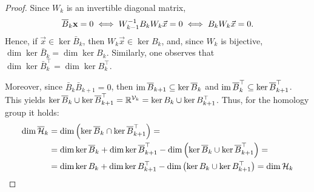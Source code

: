 \begin{proof}
Since \( W_k \) is an invertible diagonal matrix, 
\begin{equation*}
    \overline{B}_k \mathbf{x} = 0 \iff W_{k-1}^{-1}B_k W_k \vec x =0 \iff B_k W_k \vec x =0. 
\end{equation*}
Hence, if \( \vec x \in \ker \bar B_k \), then \( W_k \vec x \in \ker B_k \), and, since \( W_k \) is bijective, \( \dim \ker \bar B_k = \dim \ker B_k \). Similarly, one observes that \( \dim \ker \bar B_k^\top = \dim \ker B_k^\top \).

Moreover, since \( \bar B_k \bar B_{k+1} =0 \), then \( \operatorname{im} \overline{B}_{k+1} \subseteq \ker \overline{B}_k \) and \( \operatorname{im} \overline{B}_k^\top \subseteq \ker \overline{B}_{k+1}^\top \). This yields \( \ker \overline{B}_k \cup \ker \overline{B}_{k+1}^\top = \mathbb{R}^{\mathcal{V}_k} = \ker B_k \cup \ker  B_{k+1}^\top\). Thus, for the homology group it holds:
\begin{equation*}
      \begin{aligned}
    \dim \overline{\mathcal{H}}_k & = \dim \left( \ker \overline{B}_k \cap \ker \overline{B}_{k+1}^\top \right)= \\
    & = \dim \ker \overline{B}_k + \dim \ker \overline{B}_{k+1}^\top - \dim \left( \ker \overline{B}_k \cup \ker \overline{B}_{k+1}^\top \right) = \\
    & = \dim \ker B_k + \dim \ker  B_{k+1}^\top - \dim \left( \ker  B_k \cup \ker  B_{k+1}^\top \right) = \dim \mathcal{H}_k
      \end{aligned}
\end{equation*}
\end{proof}




